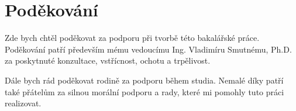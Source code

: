 \null 
\section*{Poděkování}

Zde bych chtěl poděkovat za podporu při tvorbě této bakalářské práce. Poděkování patří především mému vedoucímu Ing. Vladimíru Smutnému, Ph.D. za poskytnuté konzultace, vstřícnost, ochotu a trpělivost. 

Dále bych rád poděkovat rodině za podporu během studia. Nemalé díky patří také přátelům za silnou morální podporu a rady, které mi pomohly tuto práci realizovat.   

\vfill{}
